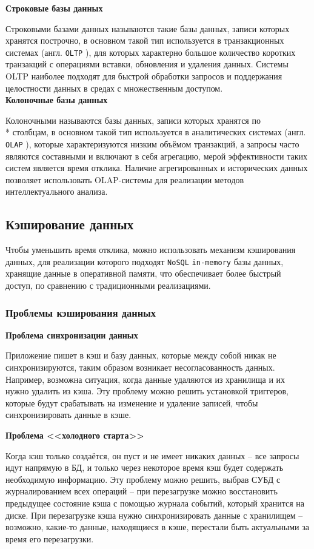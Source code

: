 \noindent\textbf{Строковые базы данных}

Строковыми базами данных называются такие базы данных, записи которых хранятся построчно, в основном такой тип используется в транзакционных системах (англ. \texttt{OLTP} \cite{OLTP}), для которых характерно большое количество коротких транзакций с операциями вставки, обновления и удаления данных. Системы OLTP наиболее подходят для быстрой обработки запросов и поддержания целостности данных в средах с множественным доступом.\\

\noindent\textbf{Колоночные базы данных}

Колоночными называются базы данных, записи которых хранятся по \\* столбцам, в основном такой тип используется в аналитических системах (англ. \texttt{OLAP} \cite{olap}), которые характеризуются низким объёмом транзакций, а запросы часто являются составными и включают в себя агрегацию, мерой эффективности таких систем является время отклика. Наличие агрегированных и исторических данных позволяет использовать OLAP-системы для реализации методов интеллектуального анализа.

\subsection{Кэширование данных}

Чтобы уменьшить время отклика, можно использовать механизм кэширования данных, для реализации которого подходят \texttt{NoSQL} \cite{nosql} \texttt{in-memory} базы данных, хранящие данные в оперативной памяти, что обеспечивает более быстрый доступ, по сравнению с традиционными реализациями.

\subsubsection{Проблемы кэширования данных}

\noindent\textbf{Проблема синхронизации данных}

Приложение пишет в кэш и базу данных, которые между собой никак не синхронизируются, таким образом возникает несогласованность данных. Например, возможна ситуация, когда данные удаляются из хранилища и их нужно удалить из кэша. Эту проблему можно решить установкой триггеров, которые будут срабатывать на изменение и удаление записей, чтобы синхронизировать данные в кэше.

\noindent\textbf{Проблема <<холодного старта>>}

Когда кэш только создаётся, он пуст и не имеет никаких данных -- все запросы идут напрямую в БД, и только через некоторое время кэш будет содержать необходимую информацию. Эту проблему можно решить, выбрав СУБД с журналированием всех операций -- при перезагрузке можно восстановить предыдущее состояние кэша с помощью журнала событий, который хранится на диске. При перезагрузке кэша нужно синхронизировать данные с хранилищем -- возможно, какие-то данные, находящиеся в кэше, перестали быть актуальными за время его перезагрузки.
